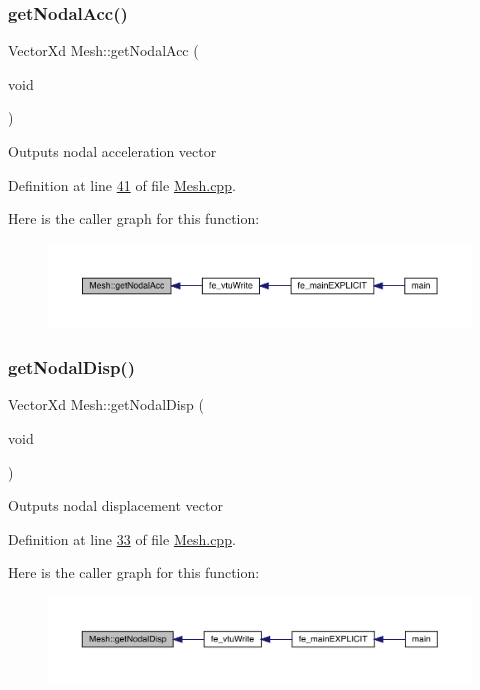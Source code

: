 \subsubsection{\texorpdfstring{get\+Nodal\+Acc()}{getNodalAcc()}}
{\footnotesize\ttfamily Vector\+Xd Mesh\+::get\+Nodal\+Acc (\begin{DoxyParamCaption}\item[{void}]{ }\end{DoxyParamCaption})}

Outputs nodal acceleration vector 

Definition at line \hyperlink{_mesh_8cpp_source_l00041}{41} of file \hyperlink{_mesh_8cpp_source}{Mesh.\+cpp}.

Here is the caller graph for this function\+:\nopagebreak
\begin{figure}[H]
\begin{center}
\leavevmode
\includegraphics[width=350pt]{class_mesh_ad41670edd4e6335071012837a58fb725_icgraph}
\end{center}
\end{figure}
\mbox{\label{class_mesh_a3fbc4b3c21f738efc6cdf3d02e31ad23}} 
\subsubsection{\texorpdfstring{get\+Nodal\+Disp()}{getNodalDisp()}}
{\footnotesize\ttfamily Vector\+Xd Mesh\+::get\+Nodal\+Disp (\begin{DoxyParamCaption}\item[{void}]{ }\end{DoxyParamCaption})}

Outputs nodal displacement vector 

Definition at line \hyperlink{_mesh_8cpp_source_l00033}{33} of file \hyperlink{_mesh_8cpp_source}{Mesh.\+cpp}.

Here is the caller graph for this function\+:\nopagebreak
\begin{figure}[H]
\begin{center}
\leavevmode
\includegraphics[width=350pt]{class_mesh_a3fbc4b3c21f738efc6cdf3d02e31ad23_icgraph}
\end{center}
\end{figure}
\mbox{\label{class_mesh_a052cd330cb8ccecf63e960a7afd0a6d9}} 
